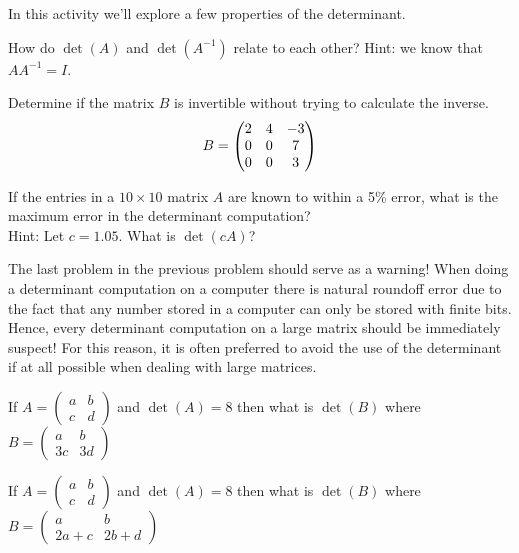 % 
\begin{problem}
    In this activity we'll explore a few properties of the determinant.
    \ba
        \item How do $\det(A)$ and $\det(A^{-1})$ relate to each other? Hint: we know that
            $AA^{-1} = I$.
        \item Determine if the matrix $B$ is invertible without trying to calculate the
            inverse.
            \[ B = \begin{pmatrix} 2 & 4 & -3 \\ 0 & 0 & 7 \\ 0 & 0 & 3 \end{pmatrix} \]
        \item If the entries in a $10 \times 10$ matrix $A$ are known to within a 5\%
            error, what is the maximum error in the determinant computation? \\ Hint: Let
            $c=1.05$.  What is $\det(cA)$?
    \ea
\end{problem}
% 
The last problem in the previous problem should serve as a warning!  When doing a
determinant computation on a computer there is natural roundoff error due to the fact that
any number stored in a computer can only be stored with finite bits.  Hence, every
determinant computation on a large matrix should be immediately suspect! For this reason,
it is often preferred to avoid the use of the determinant if at all possible when dealing
with large matrices. 

\begin{problem}
    If $A = \begin{pmatrix} a & b \\ c & d \end{pmatrix}$ and $\det(A) = 8$ then what is
        $\det(B)$ where $B = \begin{pmatrix} a & b \\ 3c & 3d \end{pmatrix}$
\end{problem}


\begin{problem}
    If $A = \begin{pmatrix} a & b \\ c & d \end{pmatrix}$ and $\det(A) = 8$ then what is
    $\det(B)$ where $B = \begin{pmatrix} a & b \\ 2a+c & 2b + d \end{pmatrix}$    
\end{problem}


